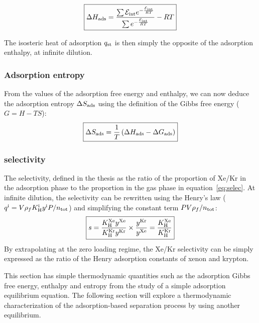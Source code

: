 \documentclass[main.tex]{subfiles}
\begin{document}
\begin{equation}\label{eq:ads_enthalpy}
  \boxed{
  \Delta H_{\text{ads}} = \dfrac{\sum \mathcal{E}_{\text{int}}e^{-\frac{\mathcal{E}_{\text{int}}}{RT}}}{\sum e^{-\frac{\mathcal{E}_{\text{int}}}{RT}}} - RT
  }
\end{equation}

The isosteric heat of adsorption $q_{\text{st}}$ is then simply the opposite of the adsorption enthalpy, at infinite dilution. 

\subsubsection{Adsorption entropy}

From the values of the adsorption free energy and enthalpy, we can now deduce the adsorption entropy $\Delta S_{\text{ads}}$ using the definition of the Gibbs free energy ($G = H-TS$):
\begin{equation}\label{eq:ads_entropy}
  \boxed{
  \Delta S_{\text{ads}} = \dfrac{1}{T} \left(\Delta H_{\text{ads}} - \Delta G_{\text{ads}} \right)
  }
\end{equation}

\subsubsection{selectivity}

The selectivity, defined in the thesis as the ratio of the proportion of Xe/Kr in the adsorption phase to the proportion in the gas phase in equation~\ref{eq:selec}. At infinite dilution, the selectivity can be rewritten using the Henry's law ($q^{\text{i}}=V\rho_f K_{\text{H}}^{\text{i}}y^{\text{i}}P/n_{\text{tot}}$) and simplifying the constant term $PV\rho_f/n_{\text{tot}}$:
\begin{equation}\label{eq:selec_0}
  \boxed{
  s = \dfrac{K_{\text{H}}^{\text{Xe}}y^{\text{Xe}}}{K_{\text{H}}^{\text{Kr}}y^{\text{Kr}}}\times\dfrac{y^{\text{Kr}}}{y^{\text{Xe}}} = \dfrac{K_{\text{H}}^{\text{Xe}}}{K_{\text{H}}^{\text{Kr}}}
  }
\end{equation}
By extrapolating at the zero loading regime, the Xe/Kr selectivity can be simply expressed as the ratio of the Henry adsorption constants of xenon and krypton.

This section has simple thermodynamic quantities such as the adsorption Gibbs free energy, enthalpy and entropy from the study of a simple adsorption equilibrium equation. The following section will explore a thermodynamic characterization of the adsorption-based separation process by using another equilibrium. 
\end{document}
